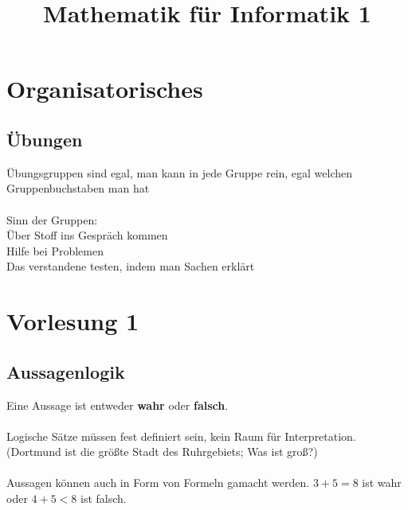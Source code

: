 \documentclass[11pt, a4paper]{article}
\begin{document}
\title{Mathematik für Informatik 1}
\maketitle

\thispagestyle{empty}


\newpage

\tableofcontents

\newpage

\section{Organisatorisches}
\subsection{Übungen}
Übungsgruppen sind egal, man kann in jede Gruppe rein, egal welchen Gruppenbuchstaben man hat\\\\Sinn der Gruppen:\\Über Stoff ins Gespräch kommen\\Hilfe bei Problemen\\Das verstandene testen, indem man Sachen erklärt
\section{Vorlesung 1}
\subsection{Aussagenlogik}
Eine Aussage ist entweder \textbf{wahr} oder \textbf{falsch}.\\\\Logische Sätze müssen fest definiert sein, kein Raum für Interpretation. (Dortmund ist die größte Stadt des Ruhrgebiets; Was ist groß?)\\\\Aussagen können auch in Form von Formeln gamacht werden. $3+5=8$ ist wahr oder $4+5<8$ ist falsch.
\end{document}
